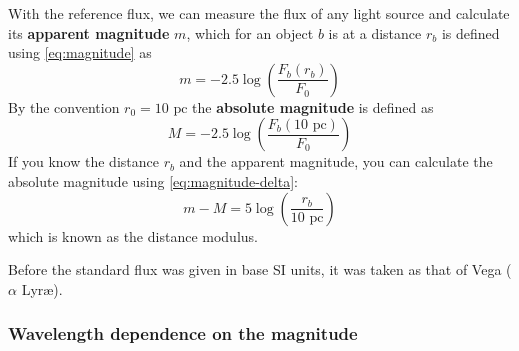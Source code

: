 	With the reference flux, we can measure the flux of any light source and calculate its \textbf{apparent magnitude} $m$,
	which for an object $b$ is at a distance $r_b$ is defined using \autoref{eq:magnitude} as
	\begin{equation}
		m = -2.5 \log\left(\frac{F_b(r_b)}{F_0}\right)
	\end{equation}
	By the convention $r_0=10\text{ pc}$ the \textbf{absolute magnitude} is defined as
	\begin{equation}
		M = -2.5 \log\left(\frac{F_b(10\text{ pc})}{F_0}\right)
	\end{equation}
	If you know the distance $r_b$ and the apparent magnitude, you can calculate the absolute magnitude using \autoref{eq:magnitude-delta}:
	\begin{equation}
		m-M = 5 \log\left(\frac{r_b}{10 \text{ pc}}\right) \label{eq:distance-modulus}
	\end{equation}
	which is known as the distance modulus.
	
	Before the standard flux was given in base SI units, it was taken as that of Vega ($\alpha$ Lyr\ae{}).
	
	\subsubsection{Wavelength dependence on the magnitude}
	
